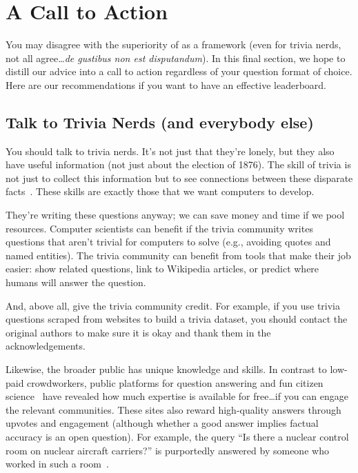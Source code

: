 
\section{A Call to Action}
\label{sec:call}


You may disagree with the superiority of \qb{} as a \qa{} framework (even for trivia nerds, not all agree\dots \textit{de gustibus non est disputandum}).
In this final section, we hope to distill our advice into a call to action regardless of your question format of choice.
Here are our recommendations if you want to have an effective leaderboard.

\subsection{Talk to Trivia Nerds (and everybody else)}

You should talk to trivia nerds.
It's not just that they're lonely, but they also have useful information (not just about the election of 1876).
The skill of trivia is not just to collect this information but to see connections between these disparate facts~\cite{jennings-06}.
These skills are exactly those that we want computers to develop.

They're writing these questions anyway; we can save money and time if we pool resources.
Computer scientists can benefit if the trivia community writes questions that aren't trivial for computers to solve (e.g., avoiding quotes and named entities).
The trivia community can benefit from tools that make their job easier: show related questions, link to Wikipedia articles, or predict where humans will answer the question.

And, above all, give the trivia community credit.
For example, if you use trivia questions scraped from websites to build a trivia \qa{} dataset, you should contact the original authors to make sure it is okay and thank them in the acknowledgements.  

Likewise, the broader public has unique knowledge and skills.
In contrast to low-paid crowdworkers, public platforms for question answering and fun citizen science~\cite{bowser-13} have revealed how much expertise is available for free\dots if you can engage the relevant communities.
These sites also reward high-quality answers through upvotes and engagement (although whether a good answer implies factual accuracy is an open question).
For example, the  query ``Is there a nuclear control room on nuclear aircraft carriers?'' is purportedly answered by someone who worked in such a room~\cite{humphries-17}.

